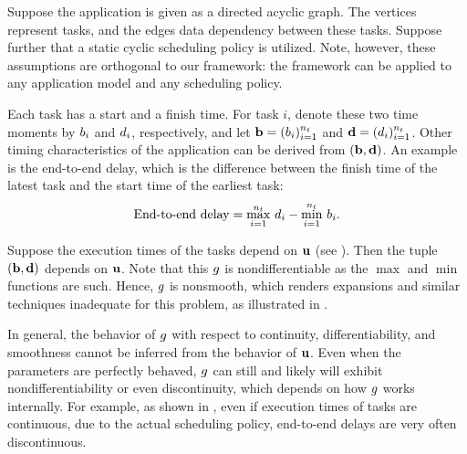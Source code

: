 Suppose the application is given as a directed acyclic graph. The vertices
represent tasks, and the edges data dependency between these tasks. Suppose
further that a static cyclic scheduling policy is utilized. Note, however, these
assumptions are orthogonal to our framework: the framework can be applied to any
application model and any scheduling policy.

Each task has a start and a finish time. For task $i$, denote these two time
moments by $b_i$ and $d_i$, respectively, and let $\mathbf{b} = (b_i)_{i=1}^{n_t}$ and
$\mathbf{d} = (d_i)_{i=1}^{n_t}$. Other timing characteristics of the application can be
derived from $(\mathbf{b}, \mathbf{d})$. An example is the end-to-end delay, which is the
difference between the finish time of the latest task and the start time of the
earliest task:
\begin{equation} \elab{end-to-end-delay}
  \text{End-to-end delay} = \max_{i = 1}^\nt \, \d_i - \min_{i = 1}^\nt \, \b_i.
\end{equation}

Suppose the execution times of the tasks depend on $\mathbf{u}$ (see ).
Then the tuple $(\mathbf{b}, \mathbf{d})$ depends on $\mathbf{u}$.  Note that this $g$ is nondifferentiable as the $\max$ and $\min$
functions are such. Hence, $g$ is nonsmooth, which renders  expansions
and similar techniques inadequate for this problem, as illustrated in
.

\begin{remark} 
In general, the behavior of $g$ with respect to continuity, differentiability,
and smoothness cannot be inferred from the behavior of $\mathbf{u}$. Even when the
parameters are perfectly behaved, $g$ can still and likely will exhibit
nondifferentiability or even discontinuity, which depends on how $g$ works
internally. For example, as shown in \cite{tanasa2015}, even if execution times
of tasks are continuous, due to the actual scheduling policy, end-to-end delays
are very often discontinuous.
\end{remark}

